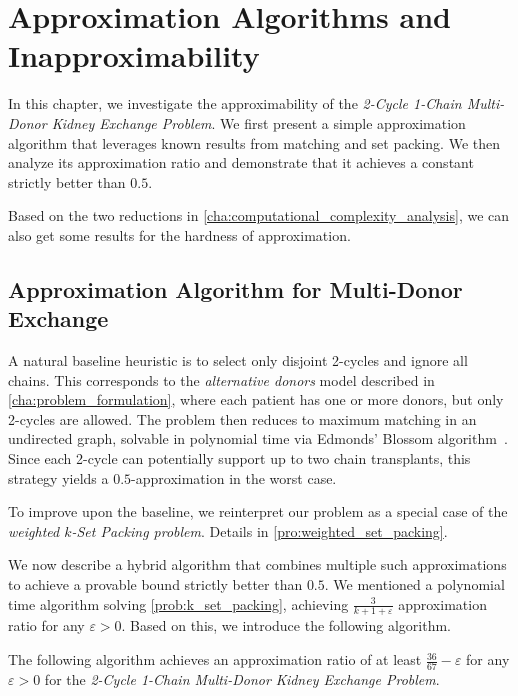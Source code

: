 \chapter{Approximation Algorithms and Inapproximability}
\label{cha:approximation}

In this chapter, we investigate the approximability of the \textit{2-Cycle 1-Chain Multi-Donor Kidney Exchange Problem}. We first present a simple approximation algorithm that leverages known results from matching and set packing. We then analyze its approximation ratio and demonstrate that it achieves a constant strictly better than $0.5$.

Based on the two reductions in \autoref{cha:computational_complexity_analysis}, we can also get some results for the hardness of approximation.


\section{Approximation Algorithm for Multi-Donor Exchange}

A natural baseline heuristic is to select only disjoint 2-cycles and ignore all chains. This corresponds to the \emph{alternative donors} model described in \autoref{cha:problem_formulation}, where each patient has one or more donors, but only 2-cycles are allowed. The problem then reduces to maximum matching in an undirected graph, solvable in polynomial time via Edmonds' Blossom algorithm~\cite{edmonds1965paths}. Since each 2-cycle can potentially support up to two chain transplants, this strategy yields a $0.5$-approximation in the worst case.

To improve upon the baseline, we reinterpret our problem as a special case of the \textit{weighted $k$-Set Packing problem}. Details in \autoref{pro:weighted_set_packing}. %

We now describe a hybrid algorithm that combines multiple such approximations to achieve a provable bound strictly better than $0.5$. 
We mentioned a polynomial time algorithm solving \autoref{prob:k_set_packing}, achieving $\frac{3}{k + 1 + \varepsilon}$ approximation ratio for any $\varepsilon > 0$. Based on this, we introduce the following algorithm.

\begin{lemma}
The following algorithm achieves an approximation ratio of at least $\frac{36}{67} - \varepsilon$ for any $\varepsilon > 0$ for the \textit{2-Cycle 1-Chain Multi-Donor Kidney Exchange Problem}.
\end{lemma}

